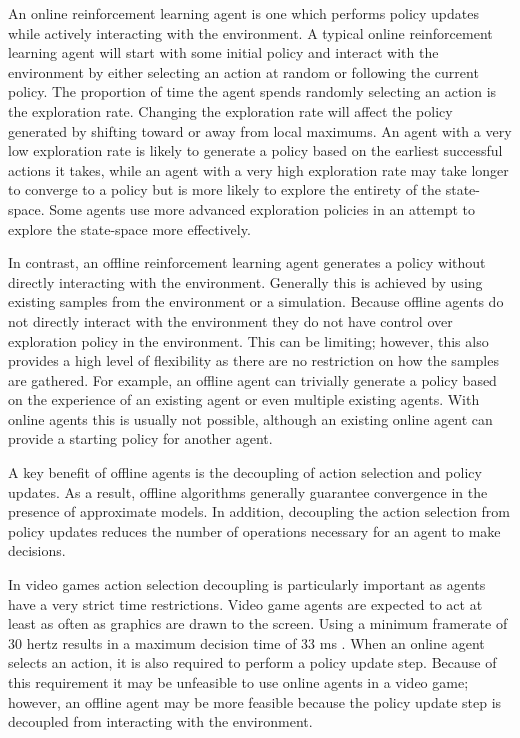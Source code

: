 An online reinforcement learning agent is one which performs policy updates while actively interacting with the environment. A typical online reinforcement learning agent will start with some initial policy and interact with the environment by either selecting an action at random or following the current policy. The proportion of time the agent spends randomly selecting an action is the exploration rate. Changing the exploration rate will affect the policy generated by shifting toward or away from local maximums. An agent with a very low exploration rate is likely to generate a policy based on the earliest successful actions it takes, while an agent with a very high exploration rate may take longer to converge to a policy but is more likely to explore the entirety of the state-space. Some agents use more advanced exploration policies in an attempt to explore the state-space more effectively.

In contrast, an offline reinforcement learning agent generates a policy without directly interacting with the environment. Generally this is achieved by using existing samples from the environment or a simulation. Because offline agents do not directly interact with the environment they do not have control over exploration policy in the environment. This can be limiting; however, this also provides a high level of flexibility as there are no restriction on how the samples are gathered. For example, an offline agent can trivially generate a policy based on the experience of an existing agent or even multiple existing agents. With online agents this is usually not possible, although an existing online agent can provide a starting policy for another agent.

A key benefit of offline agents is the decoupling of action selection and policy updates. As a result, offline algorithms generally guarantee convergence in the presence of approximate models. In addition, decoupling the action selection from policy updates reduces the number of operations necessary for an agent to make decisions. 

In video games action selection decoupling is particularly important as agents have a very strict time restrictions. Video game agents are expected to act at least as often as graphics are drawn to the screen. Using a minimum framerate of 30 hertz results in a maximum decision time of 33 ms \cite{game:ai:lecture}. When an online agent selects an action, it is also required to perform a policy update step. Because of this requirement it may be unfeasible to use online agents in a video game; however, an offline agent may be more feasible because the policy update step is decoupled from interacting with the environment.

